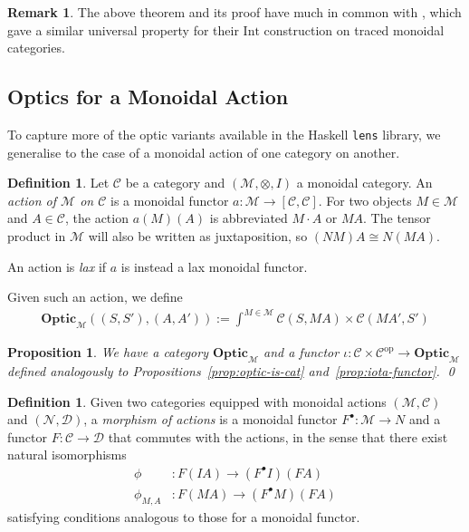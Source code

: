 \documentclass[11pt,letterpaper]{article}
\theoremstyle{plain}
\newtheorem{proposition}[theorem]{Proposition}
\theoremstyle{definition}
\newtheorem{definition}[theorem]{Definition}
\newtheorem{remark}[theorem]{Remark}
\newcommand{\C}{\mathscr{C}}
\newcommand{\D}{\mathscr{D}}
\newcommand{\M}{\mathscr{M}}
\newcommand{\N}{\mathscr{N}}
\newcommand{\lenslib}{\texttt{lens}}
\newcommand{\Optic}{\mathbf{Optic}}
\newcommand{\op}{\mathrm{op}}
\newcommand{\act}{\cdot}
\newcommand{\todo}[1]{\textcolor{red}{\small #1}}
\begin{document}
\begin{remark}
The above theorem and its proof have much in common with \cite[Proposition 5.2]{JoyalStreetVerity}, which gave a similar universal property for their $\mathrm{Int}$ construction on traced monoidal categories.
\end{remark}

\subsection{Optics for a Monoidal Action}

To capture more of the optic variants available in the Haskell \lenslib{} library, we generalise to the case of a monoidal action of one category on another.

\begin{definition}
  Let $\C$ be a category and $(\M, \otimes, I)$ a monoidal category. An \emph{action of $\M$ on $\C$} is a monoidal functor $a : \M \to [\C, \C]$. For two objects $M \in \M$ and $A \in \C$, the action $a(M)(A)$ is abbreviated $M \act A$ or $MA$. The tensor product in $\M$ will also be written as juxtaposition, so $(NM)A \cong N(MA)$.
  
An action is \emph{lax} if $a$ is instead a lax monoidal functor.
\end{definition}

Given such an action, we define
\begin{align*}
  \Optic_\M((S, S'), (A, A')) := \int^{M \in \M} \C(S, MA) \times \C(MA', S')
\end{align*}

\begin{proposition}
  We have a category $\Optic_\M$ and a functor $\iota : \C \times \C^\op \to \Optic_\M$ defined analogously to Propositions~\ref{prop:optic-is-cat} and~\ref{prop:iota-functor}. \qed
\end{proposition}

\begin{definition}
Given two categories equipped with monoidal actions $(\M, \C)$ and $(\N, \D)$, a \emph{morphism of actions} is a monoidal functor $F^\bullet : \M \to N$ and a functor $F : \C \to \D$ that commutes with the actions, in the sense that there exist natural isomorphisms
  \begin{align*}
  \phi &: F(I A) \to (F^\bullet I)(FA) \\
  \phi_{M,A} &: F(MA) \to (F^\bullet M)(F A)
  \end{align*}
satisfying conditions analogous to those for a monoidal functor.

\end{definition}
\end{document}
